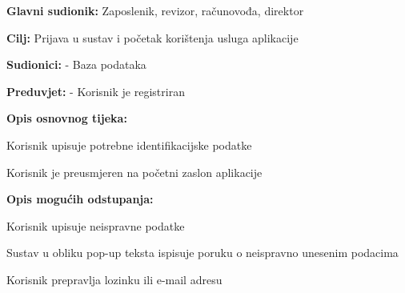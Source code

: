 					\noindent {}
						\begin{packed_item}
		
							\item \textbf{Glavni sudionik:} Zaposlenik, revizor, računovođa, direktor
							\item  \textbf{Cilj:} Prijava u sustav i početak korištenja usluga aplikacije
							\item  \textbf{Sudionici:} - Baza podataka
							\item  \textbf{Preduvjet:} - Korisnik je registriran
							\item  \textbf{Opis osnovnog tijeka:}
							
							\item[] \begin{packed_enum}
								\item Korisnik upisuje potrebne identifikacijske podatke
								\item Korisnik je preusmjeren na početni zaslon aplikacije
							\end{packed_enum}
							
							\item  \textbf{Opis mogućih odstupanja:}
							
							\item[] \begin{packed_item}
		
								\item[1.a]Korisnik upisuje neispravne podatke 
								\item[] \begin{packed_enum}
									\item Sustav u obliku pop-up teksta ispisuje poruku o neispravno unesenim podacima
									\item Korisnik prepravlja lozinku ili e-mail adresu
								\end{packed_enum}
							\end{packed_item}
						\end{packed_item}

